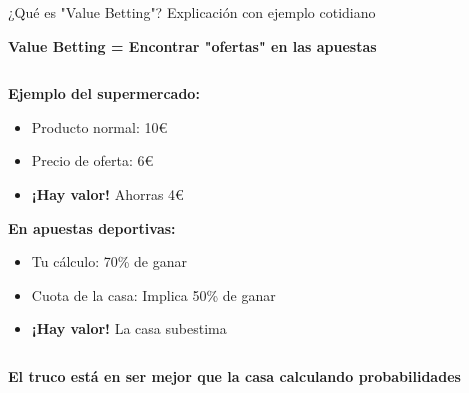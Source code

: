 \documentclass[aspectratio=169]{beamer}
\begin{document}
\begin{frame}{¿Qué es "Value Betting"? Explicación con ejemplo cotidiano}
\begin{center}
\Large \textbf{Value Betting = Encontrar "ofertas" en las apuestas}
\end{center}

\vspace{0.5cm}

\begin{columns}
\begin{column}{0.5\textwidth}
\textbf{Ejemplo del supermercado:}
\begin{itemize}
\item Producto normal: 10€
\item Precio de oferta: 6€
\item \textcolor{verdeganancia}{\textbf{¡Hay valor!}} Ahorras 4€
\end{itemize}

\vspace{0.3cm}
\textbf{En apuestas deportivas:}
\begin{itemize}
\item Tu cálculo: 70\% de ganar
\item Cuota de la casa: Implica 50\% de ganar
\item \textcolor{verdeganancia}{\textbf{¡Hay valor!}} La casa subestima
\end{itemize}
\end{column}

\begin{column}{0.5\textwidth}
\end{column}
\end{columns}

\vspace{0.5cm}
\begin{center}
\textbf{El truco está en ser mejor que la casa calculando probabilidades}
\end{center}
\end{frame}
\end{document}

